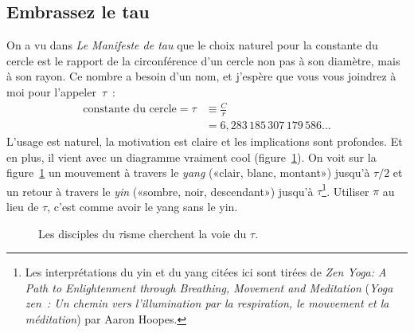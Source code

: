 
  \subsection{Embrassez le tau} %
  \label{sec:embrace_the_tau}

On a vu dans \emph{Le Manifeste de tau} que le choix naturel pour la constante
du cercle est le rapport de la circonférence d'un cercle non pas à son diamètre,
mais à son rayon. Ce nombre a besoin d'un nom, et j'espère que vous vous
joindrez à moi pour l'appeler~$\tau$~:
\[
\begin{split}
\mbox{constante du cercle} = \tau & \equiv \frac{C}{r} \\
                                  & = 6{,}283\,185\,307\,179\,586\ldots
\end{split}
\]
L'usage est naturel, la motivation est claire et les implications sont
profondes. Et en plus, il vient avec un diagramme vraiment cool
(figure~\ref{fig:tauism}). On voit sur la figure~\ref{fig:tauism} un mouvement à
travers le \emph{yang} («\ns clair, blanc, montant\ns ») jusqu'à $\tau/2$ et un
retour à travers le \emph{yin} («\ns sombre, noir, descendant\ns ») jusqu'à
$\tau$\ns\footnote{Les interprétations du yin et du yang citées ici sont tirées
de \emph{Zen Yoga: A Path to Enlightenment through Breathing, Movement and
Meditation} (\emph{Yoga zen~: Un chemin vers l'illumination par la respiration,
le mouvement et la méditation}) par Aaron Hoopes.}. Utiliser $\pi$ au lieu de
$\tau$, c'est comme avoir le yang sans le yin.

\begin{figure}
\begin{center}
\end{center}
\caption{Les disciples du $\tau$isme cherchent la voie du
$\tau$.\label{fig:tauism}}
\end{figure}



